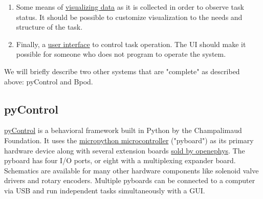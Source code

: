 \begin{enumerate}
\item Some means of \hyperref[sec:plotting]{visualizing data} as it is collected in order to  observe task status. It should be possible to customize visualization to the needs and structure of the task.
\item Finally, a \hyperref[sec:ui]{user interface} to control task operation. The UI should make it possible for someone who does not program to operate the system.
\end{enumerate}

We will briefly describe two other systems that are "complete" as described above: pyControl and Bpod.

\subsection{pyControl}

\href{https://pycontrol.readthedocs.io/en/latest/}{pyControl} is a behavioral framework built in Python by the Champalimaud Foundation. It uses the \href{https://micropython.org/}{micropython microcontroller} ("pyboard") as its primary hardware device along with several extension boards \href{http://www.open-ephys.org/store/pycontrol}{sold by openephys}. The pyboard has four I/O ports, or eight with a multiplexing expander board. Schematics are available for many other hardware components like solenoid valve drivers and rotary encoders. Multiple pyboards can be connected to a computer via USB and run independent tasks simultaneously with a GUI.

